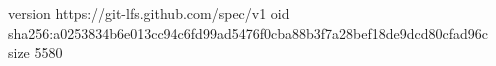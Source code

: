version https://git-lfs.github.com/spec/v1
oid sha256:a0253834b6e013cc94c6fd99ad5476f0cba88b3f7a28bef18de9dcd80cfad96c
size 5580
